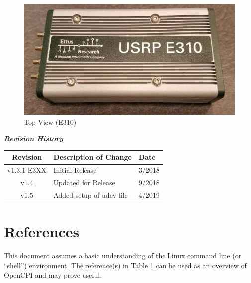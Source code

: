 \maketitle
\begin{figure}[H]
 \centering
 \includegraphics[scale=0.9]{img/top.jpg}
 \caption{Top View (E310)}
 \label{fig:top}
\end{figure}
\newpage

	\begin{center}
	\textit{\textbf{Revision History}}
		\begin{table}[H]
		\label{table:revisions} %
			\begin{tabularx}{\textwidth}{|c|X|l|}
			\hline
			\rowcolor{blue}
			\textbf{Revision} & \textbf{Description of Change} & \textbf{Date} \\
		    \hline
		    v1.3.1-E3XX & Initial Release & 3/2018 \\
			\hline
		    v1.4 & Updated for Release & 9/2018 \\
			\hline
		    v1.5 & Added setup of udev file & 4/2019 \\
			\hline
			\end{tabularx}
		\end{table}
	\end{center}

\newpage

\tableofcontents

\newpage

\section{References}
	This document assumes a basic understanding of the Linux command line (or ``shell'') environment.  The reference(s) in Table 1 can be used as an overview of OpenCPI and may prove useful.

